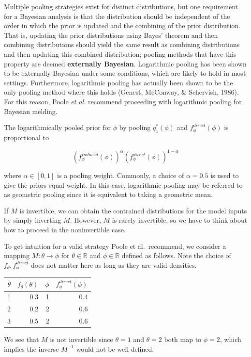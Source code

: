 \documentclass[12pt,twoside]{smiththesis}
\begin{document}
Multiple pooling strategies exist for distinct distributions, but one requirement for a Bayesian analysis is that the distribution should be independent of the order in which the prior is updated and the combining of the prior distribution. That is, updating the prior distributions using Bayes' theorem and then combining distributions should yield the same result as combining distributions and then updating this combined distribution; pooling methods that have this property are deemed \textbf{externally Bayesian}. Logarithmic pooling has been shown to be externally Bayesian under some conditions, which are likely to hold in most settings. Furthermore, logarithmic pooling has actually been shown to be the only pooling method where this holds (Genest, McConway, \& Schervish, 1986). For this reason, Poole \emph{et al.} recommend proceeding with logarithmic pooling for Bayesian melding.

The logarithmically pooled prior for \(\phi\) by pooling \(q^*_1(\phi)\) and \(f_\phi^{direct}(\phi)\) is proportional to

\[(f_\phi^{induced}(\phi))^{\alpha} (f_\phi^{direct}(\phi))^{1-\alpha}\]

where \(\alpha \in [0,1]\) is a pooling weight. Commonly, a choice of \(\alpha = 0.5\) is used to give the priors equal weight. In this case, logarithmic pooling may be referred to as geometric pooling since it is equivalent to taking a geometric mean.

If \(M\) is invertible, we can obtain the contrained distributions for the model inputs by simply inverting \(M\). However, \(M\) is rarely invertible, so we have to think about how to proceed in the noninvertible case.

To get intuition for a valid strategy Poole et al.~recommend, we consider a mapping \(M: \theta \to \phi\) for \(\theta \in \mathbb{R}\) and \(\phi \in \mathbb{R}\)
defined as follows. Note the choice of \(f_\theta,f_\phi^{direct}\) does not matter here as long as they are valid densities.
\begin{table}[H]
\centering
\begin{tabular}[t]{r|r|r|r}
\hline
$\theta$ & $f_\theta(\theta)$ & $\phi$ & $f_\phi^{direct}(\phi)$\\
\hline
1 & 0.3 & 1 & 0.4\\
\hline
2 & 0.2 & 2 & 0.6\\
\hline
3 & 0.5 & 2 & 0.6\\
\hline
\end{tabular}
\end{table}
We see that \(M\) is not invertible since \(\theta=1\) and \(\theta = 2\) both map to \(\phi=2\), which implies the inverse \(M^{-1}\) would not be well defined.
\end{document}
